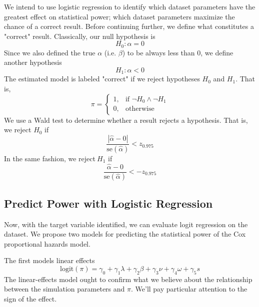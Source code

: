 We intend to use logistic regression to identify which dataset parameters have the greatest effect on statistical power; which dataset parameters maximize the chance of a correct result. Before continuing further, we define what constitutes a "correct" result. Classically, our null hypothesis is
%
\begin{equation}
    H_0 : \alpha = 0 
\end{equation}
%
Since we also defined the true $\alpha$ (i.e. $\beta$) to be always less than 0, we define another hypothesis
%
\begin{equation}
    H_1 : \alpha < 0 
\end{equation}
%
The estimated model is labeled "correct" if we reject hypotheses $H_0$ and $H_1$. That is,
%
\begin{equation}
  \pi =
  \begin{cases}
    1, & \text{if } \neg H_0 \land \neg H_1 \\
    0, & \text{otherwise}
  \end{cases}
\end{equation}
%
We use a Wald test \cite{wald} to determine whether a result rejects a hypothesis. That is, we reject $H_0$ if 
%
$$
 \frac{| \hat \alpha - 0 |}{\text{se}(\hat \alpha)} < z_{0.975}
$$
%
In the same fashion, we reject\footnotemark $~H_1$ if
%
$$
 \frac{ \hat \alpha - 0 }{\text{se}(\hat \alpha)} < -z_{0.975}
$$
%
\subsection{Predict Power with Logistic Regression}

Now, with the target variable identified, we can evaluate logit regression on the dataset. We propose two models for predicting the statistical power of the Cox proportional hazards model. 

The first models linear effects
%
\begin{equation}
    \text{logit}(\pi)  = \gamma_{0} + 
        \gamma_{1} \lambda + 
        \gamma_{2} \beta + 
        \gamma_{3} \nu +
        \gamma_{4} \omega +
        \gamma_{5} s
\end{equation}
%
The linear-effects model ought to confirm what we believe about the relationship between the simulation parameters and $\pi$. We'll pay particular attention to the sign of the effect. 

